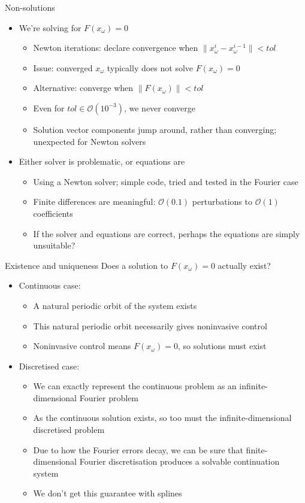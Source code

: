\documentclass[presentation]{beamer}
\begin{document}
\begin{frame}[label={sec:org14f099c}]{Non-solutions}
\begin{itemize}
\item We're solving for \(F(x_\omega) = 0\)
\begin{itemize}
\item Newton iterations: declare convergence when \(\|x^i_\omega - x^{i-1}_\omega\| < tol\)
\item Issue: converged \(x_\omega\) typically does not solve \(F(x_\omega)=0\)
\item Alternative: converge when \(\|F(x_\omega)\| < tol\)
\item Even for \(tol\in\mathcal{O}(10^{-3})\), we never converge
\item Solution vector components jump around, rather than converging; unexpected for Newton solvers
\end{itemize}
\end{itemize}
\vfill
\begin{itemize}
\item Either solver is problematic, or equations are
\begin{itemize}
\item Using a Newton solver; simple code, tried and tested in the Fourier case
\item Finite differences are meaningful: \(\mathcal{O}(0.1)\) perturbations to \(\mathcal{O}(1)\) coefficients
\item If the solver and equations are correct, perhaps the equations are simply unsuitable?
\end{itemize}
\end{itemize}
\end{frame}

\begin{frame}[label={sec:orga21762a}]{Existence and uniqueness}
Does a solution to \(F(x_\omega)=0\) actually exist?
\begin{itemize}
\item Continuous case:
\begin{itemize}
\item A natural periodic orbit of the system exists
\item This natural periodic orbit necessarily gives noninvasive control
\item Noninvasive control means \(F(x_\omega) = 0\), so solutions must exist
\end{itemize}
\item Discretised case:
\begin{itemize}
\item We can exactly represent the continuous problem as an infinite-dimensional Fourier problem
\item As the continuous solution exists, so too must the infinite-dimensional discretised problem
\item Due to how the Fourier errors decay, we can be sure that finite-dimensional Fourier discretisation produces a solvable continuation system
\item \alert{We don't get this guarantee with splines}
\end{itemize}
\end{itemize}
\end{frame}
\end{document}
